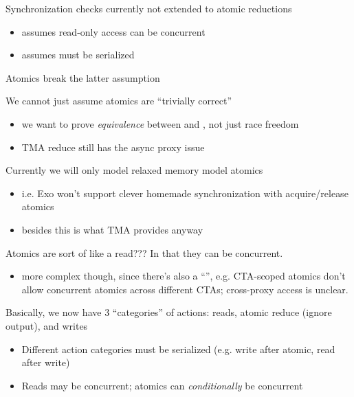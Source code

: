 \newpage
{}

Synchronization checks currently not extended to atomic reductions
\begin{itemize}
  \item assumes read-only access can be concurrent
  \item assumes  must be serialized
\end{itemize}
Atomics break the latter assumption

We cannot just assume atomics are ``trivially correct''
\begin{itemize}
  \item we want to prove \textit{equivalence} between  and , not just race freedom
  \item TMA reduce still has the async proxy issue
\end{itemize}

Currently we will only model relaxed memory model atomics
\begin{itemize}
  \item i.e. Exo won't support clever homemade synchronization with acquire/release atomics
  \item besides this is what TMA provides anyway
\end{itemize}

Atomics are sort of like a read??? In that they can be concurrent.
\begin{itemize}
  \item more complex though, since there's also a ``'', e.g. CTA-scoped atomics don't allow concurrent atomics across different CTAs; cross-proxy access is unclear.
\end{itemize}

Basically, we now have 3 ``categories'' of actions: reads, atomic reduce (ignore output), and writes
\begin{itemize}
  \item Different action categories must be serialized (e.g. write after atomic, read after write)
  \item Reads may be concurrent; atomics can \textit{conditionally} be concurrent
\end{itemize}

\newpage
{}

